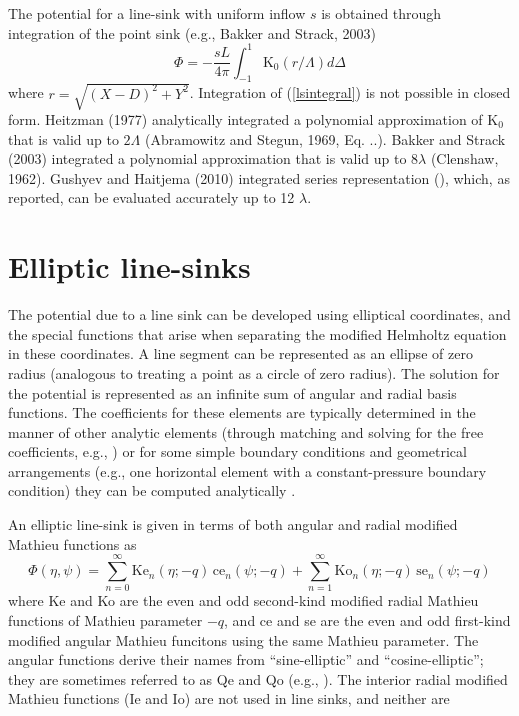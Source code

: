\documentclass{elsart}
\begin{document}
The potential for a line-sink with uniform inflow $s$ is obtained through integration of the point sink (e.g., Bakker and Strack, 2003)
\begin{equation} \label{lsintegral}
\Phi = -\frac{sL}{4\pi} \int_{-1}^{1}\text{K}_0(r/\Lambda) d\Delta
\end{equation}
where $r=\sqrt{(X-D)^2+Y^2}$. Integration of (\ref{lsintegral}) is not possible in closed form. Heitzman (1977) analytically integrated a polynomial approximation of K$_0$ that is valid up to $2\Lambda$ (Abramowitz and Stegun, 1969, Eq. ..). Bakker and Strack (2003) integrated a polynomial approximation that is valid up to $8\lambda$ (Clenshaw, 1962). Gushyev and Haitjema (2010) integrated series representation (), which, as reported, can be evaluated accurately up to 12 $\lambda$.  

\section{Elliptic line-sinks}
The potential due to a line sink can be developed using elliptical coordinates, and the special functions that arise when separating the modified Helmholtz equation in these coordinates.  A line segment can be represented as an ellipse of zero radius (analogous to treating a point as a circle of zero radius).  The solution for the potential is represented as an infinite sum of angular and radial basis functions.  The coefficients for these elements are typically determined in the manner of other analytic elements (through matching and solving for the free coefficients, e.g., \cite{bakker2004two}) or for some simple boundary conditions and geometrical arrangements (e.g., one horizontal element with a constant-pressure boundary condition) they can be computed analytically \cite{kuhlmanwarrick08,kuhlmanneuman09}.

An elliptic line-sink is given in terms of both angular and radial modified Mathieu functions as
\begin{equation}
  \label{eq:ellipse-line-sink}
  \Phi(\eta,\psi) = \sum_{n=0}^{\infty} \text{Ke}_{n}(\eta;-q) \, \text{ce}_{n}(\psi;-q) + \sum_{n=1}^{\infty} \text{Ko}_{n}(\eta;-q) \, \text{se}_{n}(\psi;-q)
\end{equation}
where Ke and Ko are the even and odd second-kind modified radial Mathieu functions of Mathieu parameter $-q$, and ce and se are the even and odd first-kind modified angular Mathieu funcitons using the same Mathieu parameter.  The angular functions derive their names from ``sine-elliptic'' and ``cosine-elliptic''; they are sometimes referred to as Qe and Qo (e.g., \cite{alhargan2000}).  The interior radial modified Mathieu functions (Ie and Io) are not used in line sinks, and neither are 
\end{document}
